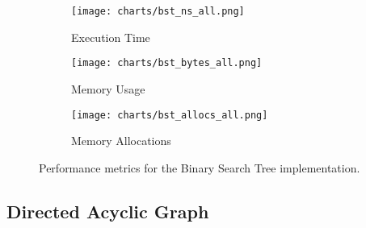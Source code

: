 \begin{figure}[H]
    \centering
    \begin{subfigure}[b]{0.8\textwidth}
        \texttt{[image: charts/bst\_ns\_all.png]}
        \caption{Execution Time}
        \label{fig:binary-search-tree-execution-time}
    \end{subfigure}

    \begin{subfigure}[b]{0.8\textwidth}
        \texttt{[image: charts/bst\_bytes\_all.png]}
        \caption{Memory Usage}
        \label{fig:binary-search-tree-memory-usage}
    \end{subfigure}

    \begin{subfigure}[b]{0.8\textwidth}
        \texttt{[image: charts/bst\_allocs\_all.png]}
        \caption{Memory Allocations}
        \label{fig:binary-search-tree-memory-allocations}
    \end{subfigure}

    \caption{Performance metrics for the Binary Search Tree implementation.}
    \label{fig:binary-search-tree-performance-metrics}
\end{figure}

\subsection{Directed Acyclic Graph}

